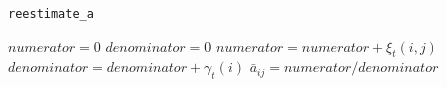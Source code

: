 \begin{algorithm}
\caption{\texttt{reestimate\_a}}
\label{koda:reestimate_a}
\begin{algorithmic}[1]
    \State $numerator = 0$
    \State $denominator = 0$
      \State $numerator = numerator + \xi_t(i,j)$
      \State $denominator = denominator + \gamma_t(i)$
    \EndFor
    \State $\bar{a}_{ij} = numerator / denominator$
  \EndFor
\EndFor
\end{algorithmic}
\end{algorithm}
